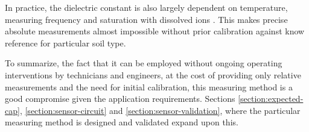 In practice, the dielectric constant is also largely dependent on temperature, measuring frequency and saturation with dissolved ions \cite{meter_group_soil_2023,podest_applications_nodate}. This makes precise absolute measurements almost impossible without prior calibration against know reference for particular soil type.

To summarize, the fact that it can be employed without ongoing operating interventions by technicians and engineers, at the cost of providing only relative measurements and the need for initial calibration, this measuring method is a good compromise given the application requirements. Sections \ref{section:expected-cap}, \ref{section:sensor-circuit} and \ref{section:sensor-validation}, where the particular measuring method is designed and validated expand upon this.
